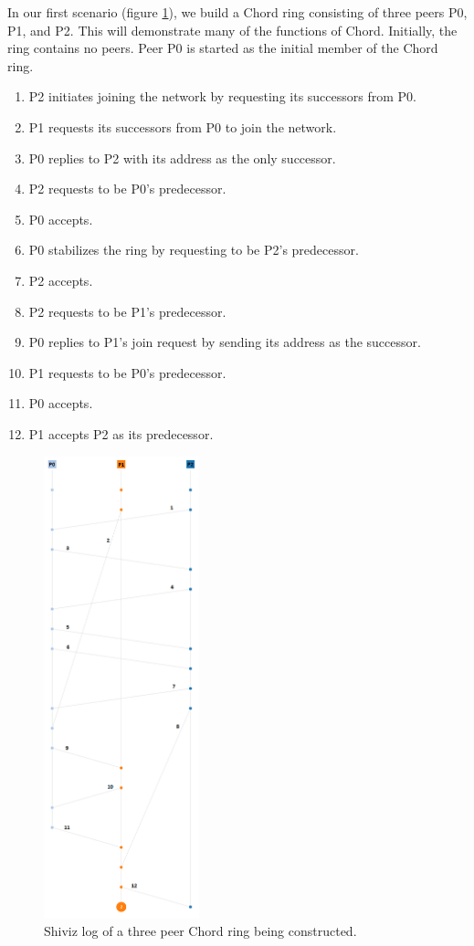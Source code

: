\documentclass[twocolumn]{article}
\begin{document}
In our first scenario (figure \ref{fig:shiviz_chord}), we build a Chord ring consisting of three peers P0, P1, and P2. This will demonstrate many of the functions of Chord. Initially, the ring contains no peers. Peer P0 is started as the initial member of the Chord ring.
\begin{enumerate}
  \item P2 initiates joining the network by requesting its successors from P0.
  \item P1 requests its successors from P0 to join the network.
  \item P0 replies to P2 with its address as the only successor.
  \item P2 requests to be P0's predecessor.
  \item P0 accepts.
  \item P0 stabilizes the ring by requesting to be P2's predecessor.
  \item P2 accepts.
  \item P2 requests to be P1's predecessor.
  \item P0 replies to P1's join request by sending its address as the successor.
  \item P1 requests to be P0's predecessor.
  \item P0 accepts.
  \item P1 accepts P2 as its predecessor.
\end{enumerate}

\begin{figure}[tbh!]
  \centering
  \includegraphics[width=0.4\textwidth]{report/images/shiviz_chord2}
  \caption{Shiviz log of a three peer Chord ring being constructed. \label{fig:shiviz_chord}}
\end{figure}
\end{document}
